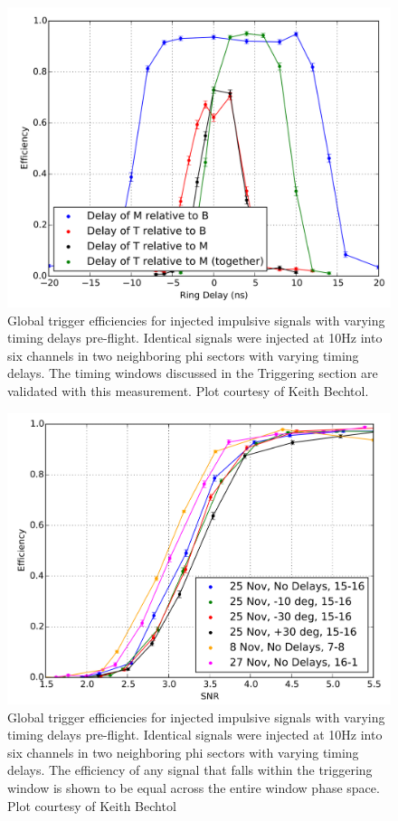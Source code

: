 \begin{figure}
	\label{fig:delayEfficiency}
		\centering
		\includegraphics[width=\textwidth]{figures/ringDelayEfficiency}
		\caption{Global trigger efficiencies for injected impulsive signals with varying timing delays pre-flight.  Identical signals were injected at 10Hz into six channels in two neighboring phi sectors with varying timing delays.  The timing windows discussed in the Triggering section are validated with this measurement.  Plot courtesy of Keith Bechtol.}
\end{figure}

\begin{figure}
	\label{fig:elevationEfficiency}
		\centering
		\includegraphics[width=\textwidth]{figures/elevationCalibrationEfficiency}
		\caption{Global trigger efficiencies for injected impulsive signals with varying timing delays pre-flight.  Identical signals were injected at 10Hz into six channels in two neighboring phi sectors with varying timing delays.  The efficiency of any signal that falls within the triggering window is shown to be equal across the entire window phase space.  Plot courtesy of Keith Bechtol}
\end{figure}
		
